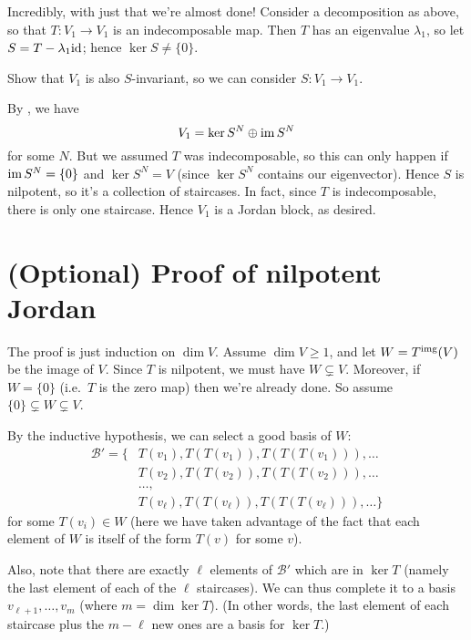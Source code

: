 Incredibly, with just that we're almost done!
Consider a decomposition as above,
so that $T : V_1 \to V_1$ is an indecomposable map.
Then $T$ has an eigenvalue $\lambda_1$, so let $S = T - \lambda_1 \mathrm{id}$; hence $\ker S \neq \{0\}$.
\begin{ques}
	Show that $V_1$ is also $S$-invariant, so we can consider $S : V_1 \to V_1$.
\end{ques}
By , we have
\[ V_1 = \ker S^N \oplus \operatorname{im} S^N \]
for some $N$.
But we assumed $T$ was indecomposable,
so this can only happen if $\operatorname{im} S^N = \{0\}$ and $\ker S^N = V$
(since $\ker S^N$ contains our eigenvector).
Hence $S$ is nilpotent, so it's a collection of staircases.
In fact, since $T$ is indecomposable, there is only one staircase.
Hence $V_1$ is a Jordan block, as desired.

\section{(Optional) Proof of nilpotent Jordan}
The proof is just induction on $\dim V$.
Assume $\dim V \ge 1$, and let $W = T^{\text{img}}(V)$ be the image of $V$.
Since $T$ is nilpotent, we must have $W \subsetneq V$.
Moreover, if $W = \{0\}$ (i.e.\ $T$ is the zero map) then we're already done.
So assume $\{0\} \subsetneq W \subsetneq V$.

By the inductive hypothesis, we can select a good basis of $W$:
\begin{align*}
	\mathcal B' =
	\Big\{ & T(v_1), T(T(v_1)), T(T(T(v_1))), \dots \\
	& T(v_2), T(T(v_2)), T(T(T(v_2))), \dots \\
	& \dots, \\
	& T(v_\ell), T(T(v_\ell)), T(T(T(v_\ell))), \dots \Big\}
\end{align*}
for some $T(v_i) \in W$ (here we have taken advantage of the fact that each element of $W$ is itself of the form $T(v)$ for some $v$).

Also, note that there are exactly $\ell$ elements of $\mathcal B'$ which are in $\ker T$
(namely the last element of each of the $\ell$ staircases).
We can thus complete it to a basis $v_{\ell+1}, \dots, v_m$ (where $m = \dim \ker T$).
(In other words, the last element of each staircase plus the $m-\ell$ new ones are a basis for $\ker T$.)

